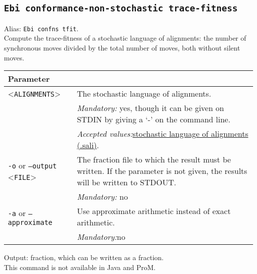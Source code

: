 {\subsection{\texttt{Ebi conformance-non-stochastic trace-fitness}}
\label{command:Ebi conformance-non-stochastic trace-fitness}
Alias: \texttt{Ebi confns tfit}.\\
Compute the trace-fitness of a stochastic language of alignments: the number of synchronous moves divided by the total number of moves, both without silent moves.\\
\begin{tabularx}{\linewidth}{lX}
\toprule
Parameter \\\midrule
<\texttt{ALIGNMENTS}>&The stochastic language of alignments.\\
&\textit{Mandatory:} \quad yes, though it can be given on STDIN by giving a `-' on the command line.\\
&\textit{Accepted values:}\quad \hyperref[filehandler:stochastic language of alignments]{stochastic language of alignments (.sali)}.\\
\texttt{-o} or \texttt{--output} <\texttt{FILE}> &
The fraction file to which the result must be written. If the parameter is not given, the results will be written to STDOUT.\\
&\textit{Mandatory:} \quad no\\
\texttt{-a} or \texttt{--approximate} & Use approximate arithmetic instead of exact arithmetic.\\
&\textit{Mandatory:}\quad no\\
\bottomrule
\end{tabularx}
\noindent Output: fraction, which can be written as a fraction.
\\This command is not available in Java and ProM.
}
